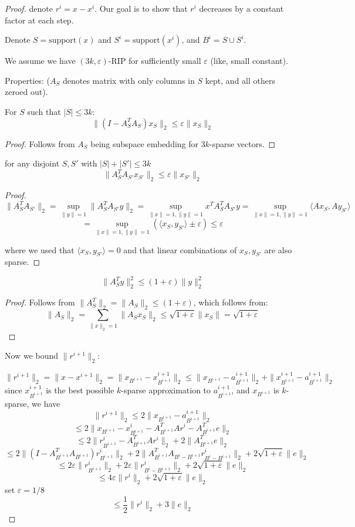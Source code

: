 \documentclass[11pt]{article}
\begin{document}
\begin{proof}

denote $r^i = x - x^i$.  Our goal is to show that $r^i$ decreases by a constant factor at each step.

Denote $S = \text{support}(x)$ and $S^i = \text{support}(x^i)$, and $B^i = S \cup S^i$.

We assume we have $(3k,\varepsilon)$-RIP for sufficiently small $\varepsilon$ (like, small constant).

Properties: ($A_S$ denotes matrix with only columns in $S$ kept, and all others zeroed out).
\begin{lemma}
For $S$ such that $|S| \le 3k$:
$$\|(I - A_S^T A_S)x_S\|_2 \le \varepsilon \|x_S\|_2$$
\end{lemma}
\begin{proof}
Follows from $A_S$ being subspace embedding for $3k$-sparse vectors.
\end{proof}

\begin{lemma}
for any disjoint $S,S'$ with $|S|+|S'| \le 3k$
$$\|A_S^TA_{S'}x_{S'}\|_2 \le \varepsilon \|x_{S'}\|_2$$
\end{lemma}
\begin{proof}
$$\|A_S^T A_{S'}\|_2 = \sup_{\|y\|=1} \|A_S^T A_{S'} y\|_2 = \sup_{\|x\|=1,\|y\|=1} x^T A_S^T A_{S'} y =  \sup_{\|x\|=1,\|y\|=1} \langle A x_S , A y_{S'} \rangle $$
$$=  \sup_{\|x\|=1,\|y\|=1} ( \langle x_S ,  y_{S'} \rangle \pm \varepsilon ) \le \varepsilon$$

where we used that $\langle x_S, y_{S'} \rangle = 0$ and that linear combinations of $x_S,y_{S'}$ are also sparse.
\end{proof}

\begin{lemma}
$$\|A^T_S y\|_2^2 \le (1+\varepsilon)\|y\|_2^2$$
\end{lemma}
\begin{proof}
Follows from $\|A_S^T\|_2 = \|A_S\|_2 \le (1+\varepsilon)$, which follows from:
$$\|A_S\|_2 = \sum_{\|x\|_2 = 1} \|A_S x_S\|_2 \le \sqrt{1+\varepsilon} \|x_S\| = \sqrt{1+\varepsilon}$$
\end{proof}


Now we bound $\|r^{i+1}\|_2$:

$$\|r^{i+1}\|_2 = \|x-x^{i+1}\|_2 = \|x_{B^{i+1}} - x^{i+1}_{B^{i+1}}\|_2 \le  \|x_{B^{i+1}} - a^{i+1}_{B^{i+1}}\|_2 + \|x^{i+1}_{B^{i+1}} - a^{i+1}_{B^{i+1}}\|_2$$
since $x^{i+1}_{B^{i+1}}$ is the best possible $k$-sparse approximation to $a^{i+1}_{B^{i+1}}$, and $x_{B^{i+1}}$ is $k$-sparse, we have
$$\|r^{i+1}\|_2 \le 2 \|x_{B^{i+1}} - a^{i+1}_{B^{i+1}}\|_2 $$
$$\le 2\|x_{B^{i+1}} - x^i_{B^{i+1}} - A^T_{B^{i+1}} A r^i  - A^T_{B^{i+1}} e\|_2$$
$$\le 2\|r^i_{B^{i+1}} - A^T_{B^{i+1}} A r^i \|_2 + 2 \|A^T_{B^{i+1}} e\|_2$$
$$\le 2\|(I - A^T_{B^{i+1}}A_{B^{i+1}})r^i_{B^{i+1}}\|_2  + 2 \|A^T_{B^{i+1}} A_{B^i-B^{i+1}} r^i_{B^i-B^{i+1}} \|_2+ 2 \sqrt{1+\varepsilon}\| e\|_2$$
$$\le 2\varepsilon\|r^i_{B^{i+1}}\|_2  + 2 \varepsilon\| r^i_{B^i-B^{i+1}} \|_2 + 2 \sqrt{1+\varepsilon}\| e\|_2$$
$$\le 4\varepsilon\|r^i\|_2 + 2 \sqrt{1+\varepsilon}\| e\|_2$$
set $\varepsilon = 1/8$
$$\le \frac12\|r^i\|_2 + 3\|e\|_2$$
\end{proof}



\end{document}
